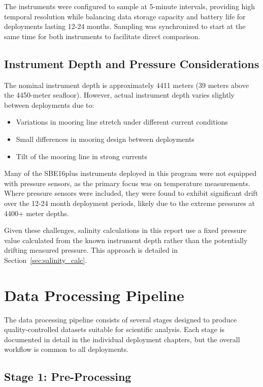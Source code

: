 The instruments were configured to sample at 5-minute intervals, providing high temporal resolution while balancing data storage capacity and battery life for deployments lasting 12-24 months. Sampling was synchronized to start at the same time for both instruments to facilitate direct comparison.

\subsection{Instrument Depth and Pressure Considerations}

The nominal instrument depth is approximately 4411 meters (39 meters above the 4450-meter seafloor). However, actual instrument depth varies slightly between deployments due to:
\begin{itemize}
    \item Variations in mooring line stretch under different current conditions
    \item Small differences in mooring design between deployments
    \item Tilt of the mooring line in strong currents
\end{itemize}

Many of the SBE16plus instruments deployed in this program were not equipped with pressure sensors, as the primary focus was on temperature measurements. Where pressure sensors were included, they were found to exhibit significant drift over the 12-24 month deployment periods, likely due to the extreme pressures at 4400+ meter depths.

Given these challenges, salinity calculations in this report use a fixed pressure value calculated from the known instrument depth rather than the potentially drifting measured pressure. This approach is detailed in Section~\ref{sec:salinity_calc}.

\section{Data Processing Pipeline}

The data processing pipeline consists of several stages designed to produce quality-controlled datasets suitable for scientific analysis. Each stage is documented in detail in the individual deployment chapters, but the overall workflow is common to all deployments.

\subsection{Stage 1: Pre-Processing}


